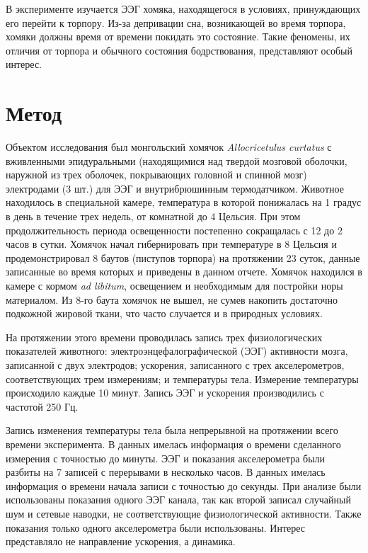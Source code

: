\documentclass[12pt,a4paper,oneside]{article}
\begin{document}
В эксперименте изучается ЭЭГ хомяка, находящегося в условиях, принуждающих его перейти к торпору. Из-за депривации сна, возникающей во время торпора, хомяки должны время от времени покидать это состояние. Такие феномены, их отличия от торпора и обычного состояния бодрствования, представляют особый интерес.

\section{Метод} %

Объектом исследования был монгольский хомячок \textit{Allocricetulus curtatus} с вживленными эпидуральными (находящимися над твердой мозговой оболочки, наружной из трех оболочек, покрывающих головной и спинной мозг) электродами (3 шт.) для ЭЭГ и внутрибрюшинным термодатчиком. Животное находилось в специальной камере, температура в которой понижалась на 1 градус в день в течение трех недель, от комнатной до 4 Цельсия. При этом продолжительность периода освещенности постепенно сокращалась с 12 до 2 часов в сутки. Хомячок начал гибернировать при температуре в 8 Цельсия и продемонстрировал 8 баутов (пиступов торпора) на протяжении 23 суток, данные записанные во время которых и приведены в данном отчете. Хомячок находился в камере с кормом \textit{ad libitum}, освещением и необходимым для постройки норы материалом. Из 8-го баута хомячок не вышел, не сумев накопить достаточно подкожной жировой ткани, что часто случается и в природных условиях.

На протяжении этого времени проводилась запись трех физиологических показателей животного: электроэнцефалографической (ЭЭГ) активности мозга, записанной с двух электродов; ускорения, записанного с трех акселерометров, соответствующих трем измерениям; и температуры тела. Измерение температуры происходило каждые 10 минут. Запись ЭЭГ и ускорения производились с частотой 250 Гц. 

Запись изменения температуры тела была непрерывной на протяжении всего времени эксперимента. В данных имелась информация о времени сделанного измерения с точностью до минуты. ЭЭГ и показания акселерометра были разбиты на 7 записей с перерывами в несколько часов. В данных имелась информация о времени начала записи с точностью до секунды. При анализе были использованы показания одного ЭЭГ канала, так как второй записал случайный шум и сетевые наводки, не соответствующие физиологической активности. Также показания только одного акселерометра были использованы. Интерес представляло не направление ускорения, а динамика. 
\end{document}

